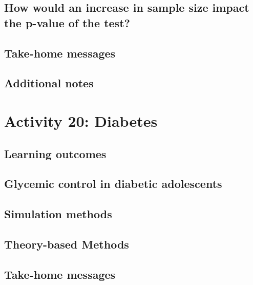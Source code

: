 \documentclass[
]{report}
\begin{document}
\subsection*{How would an increase in sample size impact the p-value of the test?}\label{how-would-an-increase-in-sample-size-impact-the-p-value-of-the-test}

\subsection{Take-home messages}\label{take-home-messages-18}

\subsection{Additional notes}\label{additional-notes-18}

\section{Activity 20: Diabetes}\label{activity-20-diabetes}

\subsection{Learning outcomes}\label{learning-outcomes-21}

\subsection{Glycemic control in diabetic adolescents}\label{glycemic-control-in-diabetic-adolescents}

\subsection*{Simulation methods}\label{simulation-methods-1}

\subsection*{Theory-based Methods}\label{theory-based-methods-2}

\subsection{Take-home messages}\label{take-home-messages-19}
\end{document}

